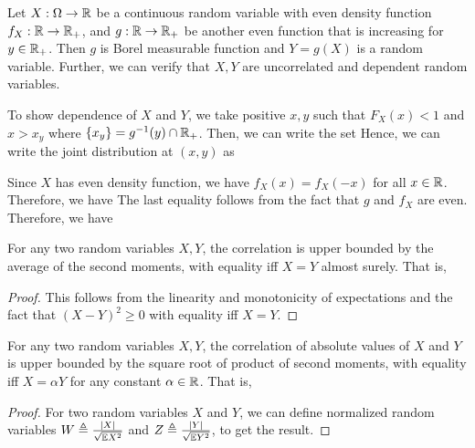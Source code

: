 \documentclass[letterpaper,10pt,english]{article}
\begin{document}
\begin{shaded}
\begin{exmp} 
Let $X: \Omega \to \mathbb{R}$ be a continuous random variable with even density function $f_X:\mathbb{R} \to \mathbb{R}_+$, 
and $g: \mathbb{R} \to \mathbb{R}_+$ be another even function that is increasing for $y \in \mathbb{R}_+$. 
Then $g$ is Borel measurable function and $Y = g(X)$ is a random variable. 
Further, we can verify that $X, Y$ are uncorrelated and dependent random variables. 

To show dependence of $X$ and $Y$, 
we take positive $x,y$ such that $F_X(x) < 1$ and $x > x_y$ where $\left\{x_y\right\} = g^{-1}(y)\cap \mathbb{R}_+$. 
Then, we can write the set 
\EQ{
A_Y(y) = Y^{-1}(-\infty, y] 
= X^{-1}[-x_y, x_y].
} %
Hence, we can write the joint distribution at $(x,y)$ as  

Since $X$ has even density function, we have $f_X(x) = f_X(-x)$ for all $x \in \mathbb{R}$. 
Therefore, we have
The last equality follows from the fact that $g$ and $f_X$ are even. 
Therefore, we have
\end{exmp}
\end{shaded}
\begin{thm} 
For any two random variables $X,Y$, the correlation is upper bounded by the average of the second moments, 
with equality iff $X=Y$ almost surely. 
That is,
\end{thm}
\begin{proof} 
This follows from the linearity and monotonicity of expectations and the fact that $(X-Y)^2 \ge 0$ with equality iff $X = Y$. 
\end{proof}
\begin{thm}  
For any two random variables $X,Y$, the correlation of absolute values of $X$ and $Y$ is upper bounded by the square root of product of second moments, 
with equality iff $X = \alpha Y$ for any constant $\alpha \in \mathbb{R}$. 
That is, 
\end{thm}
\begin{proof} 
For two random variables $X$ and $Y$, we can define normalized random variables $W \triangleq \frac{\left\lvert X\right\rvert}{\sqrt{\mathbb{E} X^2}}$ and $Z \triangleq \frac{\left\lvert Y\right\rvert}{\sqrt{\mathbb{E} Y^2}}$, to get the result.
\end{proof}
\end{document}
